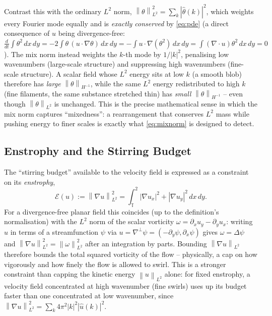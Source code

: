 \documentclass[12pt,a4paper]{article}
\newcommand{\norm}[1]{\left\lVert#1\right\rVert}
\newcommand{\Lap}{\Delta}
\newcommand{\Torus}{\mathbb{T}^2}
\newcommand{\dx}{\,dx\,dy}
\theoremstyle{definition}
\theoremstyle{plain}
\begin{document}
Contrast this with the ordinary $L^2$ norm, $\norm{\theta}_{L^2}^2 =
\sum_k|\hat\theta(k)|^2$, which weights every Fourier mode equally and is
\emph{exactly conserved} by \eqref{eq:pde} (a direct consequence of $u$
being divergence-free: $\frac{d}{dt}\int\theta^2\dx = -2\int\theta\,
(u\cdot\nabla\theta)\dx = -\int u\cdot\nabla(\theta^2)\dx = \int
(\nabla\cdot u)\theta^2\dx = 0$). The mix norm instead weights the $k$-th
mode by $1/|k|^2$, penalising low wavenumbers (large-scale structure) and
suppressing high wavenumbers (fine-scale structure). A scalar field whose
$L^2$ energy sits at low $k$ (a smooth blob) therefore has \emph{large}
$\norm{\theta}_{H^{-1}}$, while the same $L^2$ energy redistributed to high
$k$ (fine filaments, the same substance stretched thin) has \emph{small}
$\norm{\theta}_{H^{-1}}$ -- even though $\norm{\theta}_{L^2}$ is unchanged.
This is the precise mathematical sense in which the mix norm captures
``mixedness'': a rearrangement that conserves $L^2$ mass while pushing
energy to finer scales is exactly what \eqref{eq:mixnorm} is designed to
detect.

\subsection{Enstrophy and the Stirring Budget}
\label{sec:enstrophy}

The ``stirring budget'' available to the velocity field is expressed as a
constraint on its \emph{enstrophy},
\begin{equation}
  \label{eq:enstrophy}
  \mathcal{E}(u) := \norm{\nabla u}_{L^2}^2
  = \int_\Torus |\nabla u_x|^2 + |\nabla u_y|^2 \dx.
\end{equation}
For a divergence-free planar field this coincides (up to the definition's
normalisation) with the $L^2$ norm of the scalar vorticity $\omega =
\partial_x u_y - \partial_y u_x$: writing $u$ in terms of a streamfunction
$\psi$ via $u = \nabla^\perp\psi = (-\partial_y\psi,\partial_x\psi)$ gives
$\omega = \Lap\psi$ and $\norm{\nabla u}_{L^2}^2 = \norm{\omega}_{L^2}^2$
after an integration by parts. Bounding $\norm{\nabla u}_{L^2}$ therefore
bounds the total squared vorticity of the flow -- physically, a cap on how
vigorously and how finely the flow is allowed to swirl. This is a stronger
constraint than capping the kinetic energy $\norm{u}_{L^2}$ alone: for fixed
enstrophy, a velocity field concentrated at high wavenumber (fine swirls)
uses up its budget faster than one concentrated at low wavenumber, since
$\norm{\nabla u}_{L^2}^2 = \sum_k 4\pi^2|k|^2|\hat u(k)|^2$.
\end{document}
